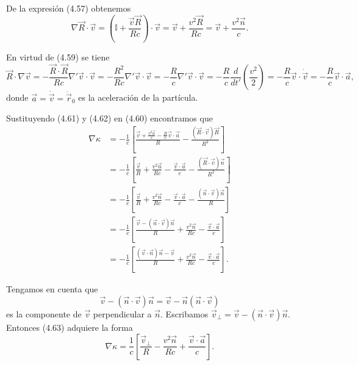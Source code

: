 \documentclass[12pt,a4paper]{book}
\begin{document}
De la expresión (4.57) obtenemos
\begin{equation}
\nabla\vec{R} \cdot \vec{v} = \left(\mathbb{I} + \frac{\vec{v}\vec{R}}{Rc}\right) \cdot \vec{v} = \vec{v} + \frac{v^2\vec{R}}{Rc} = \vec{v} + \frac{v^2\vec{n}}{c}.
\end{equation}

En virtud de (4.59) se tiene
\begin{equation}
\vec{R} \cdot \nabla\vec{v} = -\frac{\vec{R} \cdot \vec{R}}{Rc}\nabla'\vec{v} \cdot \vec{v} = -\frac{R^2}{Rc}\nabla'\vec{v} \cdot \vec{v} = -\frac{R}{c}\nabla'\vec{v} \cdot \vec{v} = -\frac{R}{c}\frac{d}{dt'}\left(\frac{v^2}{2}\right) = -\frac{R}{c}\vec{v} \cdot \dot{\vec{v}} = -\frac{R}{c}\vec{v} \cdot \vec{a},
\end{equation}
donde $\vec{a} = \dot{\vec{v}} = \ddot{\vec{r}}_0$ es la aceleración de la partícula.

Sustituyendo (4.61) y (4.62) en (4.60) encontramos que
\begin{align}
\nabla\kappa &= -\frac{1}{c}\left[\frac{\vec{v} + \frac{v^2\vec{n}}{c} - \frac{R}{c}\vec{v} \cdot \vec{a}}{R} - \frac{(\vec{R} \cdot \vec{v})\vec{R}}{R^3}\right] \nonumber \\
&= -\frac{1}{c}\left[\frac{\vec{v}}{R} + \frac{v^2\vec{n}}{Rc} - \frac{\vec{v} \cdot \vec{a}}{c} - \frac{(\vec{R} \cdot \vec{v})\vec{n}}{R^2}\right] \nonumber \\
&= -\frac{1}{c}\left[\frac{\vec{v}}{R} + \frac{v^2\vec{n}}{Rc} - \frac{\vec{v} \cdot \vec{a}}{c} - \frac{(\vec{n} \cdot \vec{v})\vec{n}}{R}\right] \nonumber \\
&= -\frac{1}{c}\left[\frac{\vec{v} - (\vec{n} \cdot \vec{v})\vec{n}}{R} + \frac{v^2\vec{n}}{Rc} - \frac{\vec{v} \cdot \vec{a}}{c}\right] \nonumber \\
&= -\frac{1}{c}\left[\frac{(\vec{v} \cdot \vec{n})\vec{n} - \vec{v}}{R} + \frac{v^2\vec{n}}{Rc} - \frac{\vec{v} \cdot \vec{a}}{c}\right].
\end{align}

Tengamos en cuenta que
\begin{equation}
\vec{v} - (\vec{n} \cdot \vec{v})\vec{n} = \vec{v} - \vec{n}(\vec{n} \cdot \vec{v})
\end{equation}
es la componente de $\vec{v}$ perpendicular a $\vec{n}$. Escribamos $\vec{v}_{\perp} = \vec{v} - (\vec{n} \cdot \vec{v})\vec{n}$. Entonces (4.63) adquiere la forma
\begin{equation}
\nabla\kappa = \frac{1}{c}\left[\frac{\vec{v}_{\perp}}{R} - \frac{v^2\vec{n}}{Rc} + \frac{\vec{v} \cdot \vec{a}}{c}\right].
\end{equation}
\end{document}
